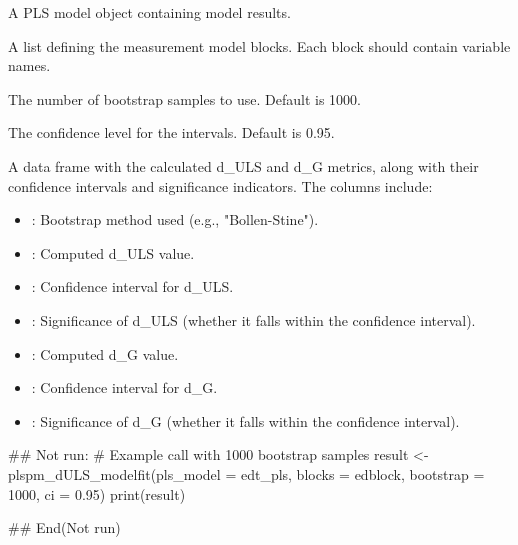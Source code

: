 \documentclass[a4paper]{book}
\begin{document}
%
\begin{Arguments}
\begin{ldescription}
\item[\code{pls\_model}] A PLS model object containing model results.

\item[\code{blocks}] A list defining the measurement model blocks. Each block should contain variable names.

\item[\code{bootstrap}] The number of bootstrap samples to use. Default is 1000.

\item[\code{ci}] The confidence level for the intervals. Default is 0.95.
\end{ldescription}
\end{Arguments}
%
\begin{Value}
A data frame with the calculated d\_ULS and d\_G metrics, along with their confidence intervals and significance indicators.
The columns include:
\begin{itemize}

\item{} : Bootstrap method used (e.g., "Bollen-Stine").
\item{} : Computed d\_ULS value.
\item{} : Confidence interval for d\_ULS.
\item{} : Significance of d\_ULS (whether it falls within the confidence interval).
\item{} : Computed d\_G value.
\item{} : Confidence interval for d\_G.
\item{} : Significance of d\_G (whether it falls within the confidence interval).

\end{itemize}

\end{Value}
%
\begin{Examples}
\begin{ExampleCode}
## Not run: 
# Example call with 1000 bootstrap samples
result <- plspm_dULS_modelfit(pls_model = edt_pls, blocks = edblock, bootstrap = 1000, ci = 0.95)
print(result)

## End(Not run)

\end{ExampleCode}
\end{Examples}
\end{document}
